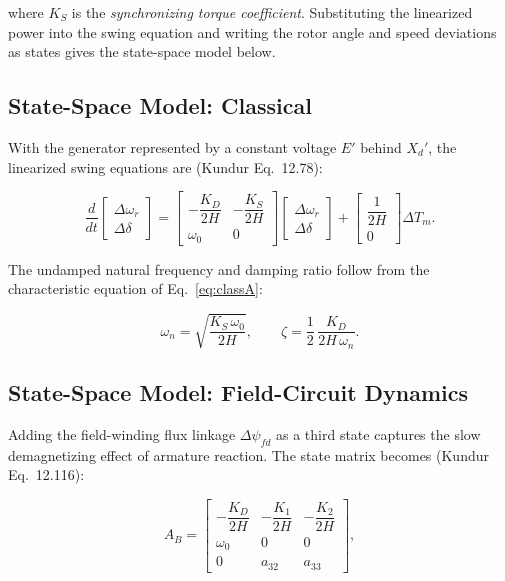 \documentclass[12pt,a4paper]{article}
\newcommand{\dwr}{\Delta\omega_r}
\newcommand{\ddel}{\Delta\delta}
\newcommand{\dpsifd}{\Delta\psi_{fd}}
\begin{document}
where $K_S$ is the \textit{synchronizing torque coefficient}. Substituting the
linearized power into the swing equation and writing the rotor angle and speed
deviations as states gives the state-space model below.

\subsection{State-Space Model: Classical}

With the generator represented by a constant voltage $E'$ behind $X_d'$, the
linearized swing equations are (Kundur Eq.~12.78):

\begin{equation}
\frac{d}{dt}
\begin{bmatrix} \dwr \\ \ddel \end{bmatrix}
=
\begin{bmatrix}
-\dfrac{K_D}{2H} & -\dfrac{K_S}{2H} \\[2ex]
\omega_0 & 0
\end{bmatrix}
\begin{bmatrix} \dwr \\ \ddel \end{bmatrix}
+
\begin{bmatrix} \dfrac{1}{2H} \\[2ex] 0 \end{bmatrix}
\Delta T_m.
\label{eq:classA}
\end{equation}

The undamped natural frequency and damping ratio follow from the characteristic
equation of Eq.~\eqref{eq:classA}:

\begin{equation}
\omega_n = \sqrt{\frac{K_S\,\omega_0}{2H}},
\qquad
\zeta = \frac{1}{2}\,\frac{K_D}{2H\,\omega_n}.
\label{eq:wn}
\end{equation}

\subsection{State-Space Model: Field-Circuit Dynamics}

Adding the field-winding flux linkage $\dpsifd$ as a third state captures the
slow demagnetizing effect of armature reaction. The state matrix becomes
(Kundur Eq.~12.116):

\begin{equation}
A_B =
\begin{bmatrix}
-\dfrac{K_D}{2H} & -\dfrac{K_1}{2H} & -\dfrac{K_2}{2H} \\[2ex]
\omega_0 & 0 & 0 \\[1ex]
0 & a_{32} & a_{33}
\end{bmatrix},
\end{equation}
\end{document}
